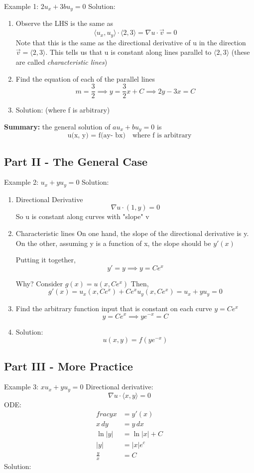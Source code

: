 \documentclass[12pt]{article}
\newcommand{\ans}[1]{\boxed{\text{#1}}}
\newcommand{\vecs}[1]{\langle #1\rangle}
\begin{document}
Example 1: $2u_x + 3bu_y = 0$
Solution:
\begin{enumerate}
    \item Observe the LHS is the same as 
    \[\langle u_x, u_y \rangle \cdot \langle 2, 3 \rangle = \nabla u \cdot \vec{v} = 0\]
    Note that this is the same as the directional derivative of u in the direction $\vec{v} = \langle 2, 3\rangle$. 
    This tells us that u is constant along lines parallel to $\vecs{2, 3}$ (these are called \emph{characteristic lines})
    \item Find the equation of each of the parallel lines
    \[m = \frac{3}{2} \implies y = \frac{3}{2}x + C \implies 2y - 3x = C\]
    \item Solution: \ans{$u(x, y) = f(2y - 3x)$} (where f is arbitrary)
\end{enumerate}

\textbf{Summary:} the general solution of $au_x + bu_y = 0$ is 
\[\ans{u(x, y) = f(ay- bx)} \quad \text{where f is arbitrary}\]

\subsection*{Part II - The General Case}
Example 2: $u_x + yu_y = 0$
Solution:
\begin{enumerate}
    \item Directional Derivative
    \[\nabla u \cdot (1, y) = 0\]
    So u is constant along curves with "slope" v 
    \item Characteristic lines 
    On one hand, the slope of the directional derivative is y.
    On the other, assuming y is a function of x, the slope should be $y'(x)$

    Putting it together,
    \[y' = y \implies y = Ce^x\]

    Why? Consider $g(x) = u(x, Ce^x)$
    Then,
    \[g'(x) = u_x(x, Ce^x) + Ce^x u_y(x, Ce^x) = u_x + yu_y = 0\]

    \item Find the arbitrary function input that is constant on each curve $y= Ce^x$
    \[y=Ce^x \implies ye^{-x} = C\]

    \item Solution:
    \[u(x, y) = f(ye^{-x})\]
\end{enumerate}

\subsection*{Part III - More Practice}
Example 3: $xu_x + yu_y = 0$
Directional derivative: 
\[\nabla u \cdot \vecs{x, y} = 0\]
ODE:
\begin{align*}
    frac{y}{x} &= y'(x) \\
    x\, dy &= y\, dx \\
    \ln |y| &= \ln |x| + C \\
    |y| &= |x|e^c \\
    \frac{y}{x} &= C
\end{align*}
Solution:
\ans{$u(x, y) = f(\frac{y}{x})$}
\end{document}
